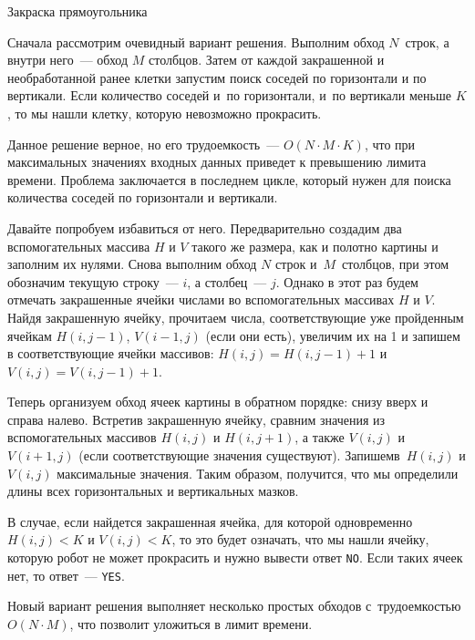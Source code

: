 \begin{tutorial}{Закраска прямоугольника}
\sloppy

Сначала рассмотрим очевидный вариант решения. Выполним обход \linebreak $N$~строк, а внутри него~--- обход $M$ столбцов. Затем от каждой закрашенной и необработанной ранее клетки запустим поиск соседей по горизонтали и по вертикали. Если количество соседей и~по горизонтали, и~по вертикали меньше $K$, то мы нашли клетку, которую невозможно прокрасить.

Данное решение верное, но его трудоемкость~--- $O(N \cdot M \cdot K)$, что при максимальных значениях входных данных приведет к превышению лимита времени. Проблема заключается в последнем цикле, который нужен для поиска количества соседей по горизонтали и вертикали.

Давайте попробуем избавиться от него. Передварительно создадим два вспомогательных массива $H$ и $V$ такого же размера, как и полотно картины и заполним их нулями. Снова выполним обход $N$ строк и~$M$~столбцов, при этом обозначим текущую строку~--- $i$, а столбец~--- $j$. Однако в этот раз будем отмечать закрашенные ячейки числами во вспомогательных массивах $H$ и $V$. Найдя закрашенную ячейку, прочитаем числа, соответствующие уже пройденным ячейкам $H(i, j-1)$, $V(i-1, j)$ (если они есть), увеличим их на 1 и запишем в соответствующие ячейки массивов: $H(i, j) = H(i, j-1) + 1$ и $V(i, j) = V(i, j-1) + 1$.

Теперь организуем обход ячеек картины в обратном порядке: снизу вверх и справа налево. Встретив закрашенную ячейку, сравним значения из вспомогательных массивов $H(i,j)$ и $H(i,j+1)$, а также $V(i,j)$ и~$V(i+1,j)$ (если соответствующие значения существуют). Запишем\linebreak в~$H(i,j)$ и $V(i,j)$ максимальные значения. Таким образом, получится, что мы определили длины всех горизонтальных и вертикальных мазков.

В случае, если найдется закрашенная ячейка, для которой одновременно $H(i,j) < K$ и $V(i,j)  < K$, то это будет означать, что мы нашли ячейку, которую робот не может прокрасить и нужно вывести ответ \texttt{NO}. Если таких ячеек нет, то ответ~--- \texttt{YES}.

Новый вариант решения выполняет несколько простых обходов с~трудоемкостью $O(N \cdot M)$, что позволит уложиться в лимит времени.

\end{tutorial}
